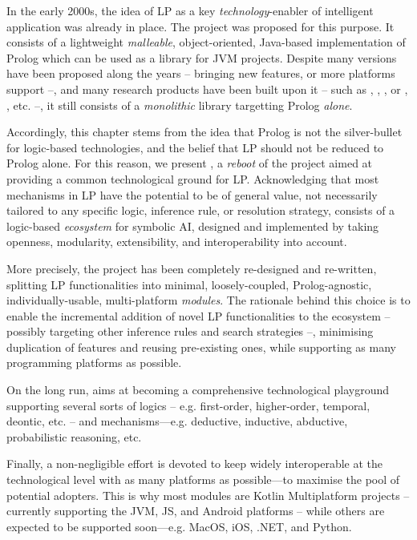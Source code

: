 \documentclass[12pt,a4paper,openright,twoside]{book}
\begin{document}
In the early 2000s, the idea of LP as a key \emph{technology}-enabler of intelligent application was already in place.
%
The \tuprolog{} project \cite{tuprolog-padl01} was proposed for this purpose.
%
It consists of a lightweight \emph{malleable}, object-oriented, Java-based implementation of Prolog \cite{tuprolog-sac08} which can be used as a library for JVM projects.
%
Despite many versions have been proposed along the years -- bringing new features, or more platforms support \cite{2p-alpnews2013} --, and many research products have been built upon it -- such as \tucson{} \cite{tucson-jaamas2}, \respect{} \cite{respect-scp41}, \lpaas{} \cite{lpaas-bdcc2}, or \tenderfone{} \cite{blockchainmas-applsci10},  \argtwop{} \cite{arg2p-cilc2020}, etc. --, it still consists of a \emph{monolithic} library targetting Prolog \emph{alone}.

Accordingly, this chapter stems from the idea that Prolog is not the silver-bullet for logic-based technologies, and the belief that LP should not be reduced to Prolog alone.
%
For this reason, we present \twopkt{}, a \emph{reboot} of the \tuprolog{} project aimed at providing a common technological ground for LP.
%
Acknowledging that most mechanisms in LP have the potential to be of general value, not necessarily tailored to any specific logic, inference rule, or resolution strategy, \twopkt{} consists of a logic-based \emph{ecosystem} for symbolic AI, designed and implemented by taking openness, modularity, extensibility, and interoperability into account.

More precisely, the \tuprolog{} project has been completely re-designed and re-written, splitting LP functionalities into minimal, loosely-coupled, Prolog-agnostic, individually-usable, multi-platform \emph{modules}.
%
The rationale behind this choice is to enable the incremental addition of novel LP functionalities to the \twopkt{} ecosystem -- possibly targeting other inference rules and search strategies --, minimising duplication of features and reusing pre-existing ones, while supporting as many programming platforms as possible.

On the long run, \twopkt{} aims at becoming a comprehensive technological playground supporting several sorts of logics -- e.g. first-order, higher-order, temporal, deontic, etc. -- and mechanisms---e.g. deductive, inductive, abductive, probabilistic reasoning, etc.

Finally, a non-negligible effort is devoted to keep \twopkt{} widely interoperable at the technological level with as many platforms as possible---to maximise the pool of potential adopters.
%
This is why most \twopkt{} modules are Kotlin Multiplatform projects -- currently supporting the JVM, JS, and Android platforms --  while others are expected to be supported soon---e.g. MacOS, iOS, .NET, and Python.
\end{document}
